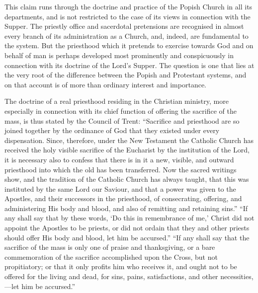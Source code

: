 \documentclass[]{book}
\begin{document}
This claim runs through the doctrine and practice of the Popish Church in all its departments, and is not restricted to the case of its views in connection with the Supper. The priestly office and sacerdotal pretensions are recognised in almost every branch of its administration as a Church, and, indeed, are fundamental to the system. But the priesthood which it pretends to exercise towards God and on behalf of man is perhaps developed most prominently and conspicuously in connection with its doctrine of the Lord's Supper. The question is one that lies at the very root of the difference between the Popish and Protestant systems, and on that account is of more than ordinary interest and importance.

The doctrine of a real priesthood residing in the Christian ministry, more especially in connection with its chief function of offering the sacrifice of the mass, is thus stated by the Council of Trent: ``Sacrifice and priesthood are so joined together by the ordinance of God that they existed under every dispensation. Since, therefore, under the New Testament the Catholic Church has received the holy visible sacrifice of the Eucharist by the institution of the Lord, it is necessary also to confess that there is in it a new, visible, and outward priesthood into which the old has been transferred. Now the sacred writings show, and the tradition of the Catholic Church has always taught, that this was instituted by the same Lord our Saviour, and that a power was given to the Apostles, and their successors in the priesthood, of consecrating, offering, and administering His body and blood, and also of remitting and retaining sins.'' ``If any shall say that by these words, `Do this in remembrance of me,' Christ did not appoint the Apostles to be priests, or did not ordain that they and other priests should offer His body and blood, let him be accursed.'' ``If any shall say that the sacrifice of the mass is only one of praise and thanksgiving, or a bare commemoration of the sacrifice accomplished upon the Cross, but not propitiatory; or that it only profits him who receives it, and ought not to be offered for the living and dead, for sins, pains, satisfactions, and other necessities,---let him be accursed.''
\end{document}
